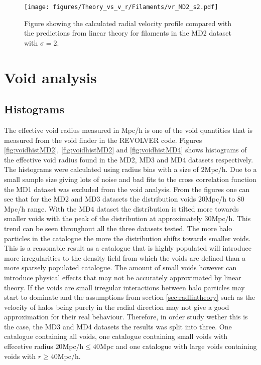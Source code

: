 \begin{figure}[htbp]
    \texttt{[image: figures/Theory\_vs\_v\_r/Filaments/vr\_MD2\_s2.pdf]}
    \caption{Figure showing the calculated radial velocity profile compared with the predictions from linear theory for filaments in the MD2 dataset with $\sigma=2$.}
    \label{fig:filvrMD2s2}
\end{figure}
\section{Void analysis}
\subsection{Histograms}
The effective void radius measured in Mpc/h is one of the void quantities that is measured from the void finder in the REVOLVER code. Figures \ref{fig:voidhistMD2}, \ref{fig:voidhistMD2} and \ref{fig:voidhistMD4} shows histograms of the effective void radius found in the MD2, MD3 and MD4 datasets respectively. The histograms were calculated using radius bins with a size of $2$Mpc/h. Due to a small sample size giving lots of noise and bad fits to the cross correlation function the MD1 dataset was excluded from the void analysis. From the figures one can see that for the MD2 and MD3 datasets the distribution voids $20$Mpc/h to $80$Mpc/h range. With the MD4 dataset the distribution is tilted more towards smaller voids with the peak of the distribution at approximately $30$Mpc/h. This trend can be seen throughout all the three datasets tested. The more halo particles in the catalogue the more the distribution shifts towards smaller voids. This is a reasonable result as a catalogue that is highly populated will introduce more irregularities to the density field from which the voids are defined than a more sparsely populated catalogue. The amount of small voids however can introduce physical effects that may not be accurately approximated by linear theory. If the voids are small irregular interactions between halo particles may start to dominate and the assumptions from section \ref{sec:radlintheory} such as the velocity of halos being purely in the radial direction may not give a good approximation for their real behaviour. Therefore, in order study wether this is the case, the MD3 and MD4 datasets the results was split into three. One catalogue containing all voids, one catalogue containing small voids with effecetive radius $20$Mpc/h$\leq 40$Mpc and one catalogue with large voids containing voids with $r\geq 40$Mpc/h. 

